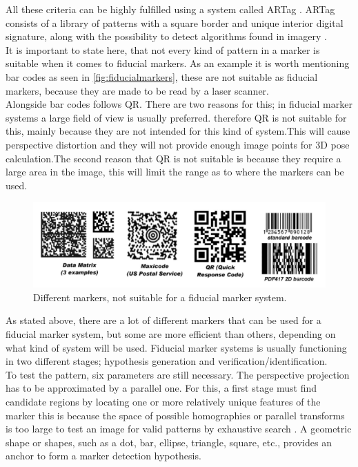				All these criteria can be highly fulfilled using a system called ARTag \cite{fiducialARTag}. ARTag consists of a library of patterns with a square border and unique interior digital signature, along with the possibility to detect algorithms found in imagery \cite{fiducialMarkers}.\\
				
				It is important to state here, that not every kind of pattern in a marker is suitable when it comes to fiducial markers\cite{fiducialMarkers}. As an example it is worth mentioning bar codes as seen in \autoref{fig:fiducialmarkers}, these are not suitable as fiducial markers, because they are made to be read by a laser scanner.\\
				Alongside bar codes follows QR. There are two reasons for this; in fiducial marker systems a large field of view is usually preferred. therefore QR is not suitable for this, mainly because they are not intended for this kind of system.This will cause perspective distortion and they will not provide enough image points for 3D pose calculation.The second reason that QR is not suitable is because they require a large area in the image, this will limit the range as to where the markers can be used.\\ 
				
				
					\begin{figure}[H]
						\centering
						\includegraphics[width=0.9\linewidth]{figure/Analysis/fiducialmarkers.png}
						\caption{Different markers, not suitable for a fiducial marker system.}
						\label{fig:fiducialmarkers}
					\end{figure}
					
				
				As stated above, there are a lot of different markers that can be used for a fiducial marker system, but some are more efficient than others, depending on what kind of system will be used.
				Fiducial marker systems is usually functioning in two different stages; hypothesis generation and verification/identification.\\
				
				To test the pattern, six parameters are still necessary. The perspective projection has to be approximated by a parallel one. For this, a first stage must find candidate regions by locating one or more relatively unique features of the marker this is because the space of possible homographies or parallel transforms is too large to test an image for valid patterns by exhaustive search \cite{fiducialMarkers}.
				A geometric shape or shapes, such as a dot, bar, ellipse, triangle, square, etc., provides an anchor to form a marker detection hypothesis.\\
				
